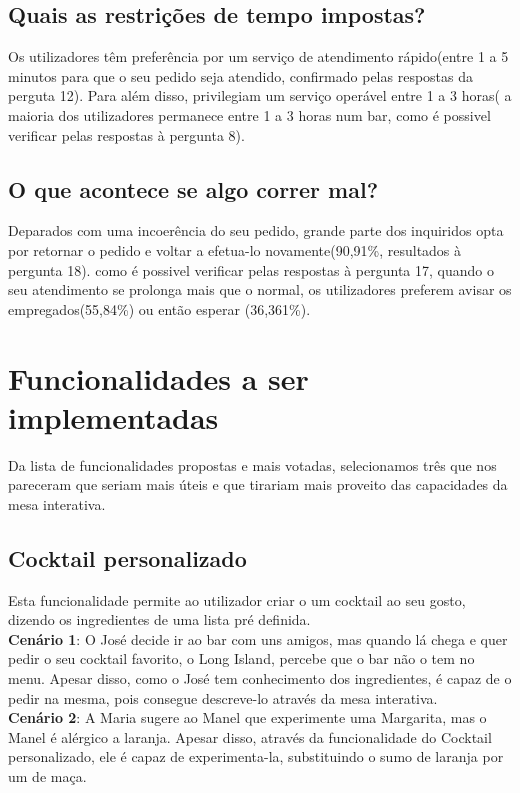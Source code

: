 \documentclass{article}
\begin{document}
\subsection*{Quais as restrições de tempo impostas?}
Os utilizadores têm preferência por um serviço de atendimento rápido(entre 1 a 5 minutos para que o seu pedido seja atendido, confirmado pelas respostas da perguta 12). Para além disso, privilegiam um serviço operável entre 1 a 3 horas( a maioria dos utilizadores permanece entre 1 a 3 horas num bar, como é possivel verificar pelas respostas à pergunta 8).
\subsection*{O que acontece se algo correr mal?}
Deparados com uma incoerência do seu pedido, grande parte dos inquiridos opta por retornar o pedido e voltar a efetua-lo novamente(90,91\%, resultados à pergunta 18). como é possivel verificar pelas respostas à pergunta 17, quando o seu atendimento se prolonga mais que o normal, os utilizadores preferem avisar os empregados(55,84\%) ou então esperar (36,361\%).

\section*{Funcionalidades a ser implementadas}

Da lista de funcionalidades propostas e mais votadas, selecionamos três que nos pareceram que seriam mais úteis e que tirariam mais proveito das capacidades da mesa interativa.

\subsection*{Cocktail personalizado}
Esta funcionalidade permite ao utilizador criar o um cocktail ao seu gosto, dizendo os ingredientes de uma lista pré definida.\\
\textbf{Cenário 1}: O José decide ir ao bar com uns amigos, mas quando lá chega e quer pedir o seu cocktail favorito, o Long Island, percebe que o bar não o tem no menu. Apesar disso, como o José tem conhecimento dos ingredientes, é capaz de o pedir na mesma, pois consegue descreve-lo através da mesa interativa.\\
\textbf{Cenário 2}: A Maria sugere ao Manel que experimente uma Margarita, mas o Manel é alérgico a laranja. Apesar disso, através da funcionalidade do Cocktail personalizado, ele é capaz de experimenta-la, substituindo o sumo de laranja por um de maça.
\\
\end{document}
